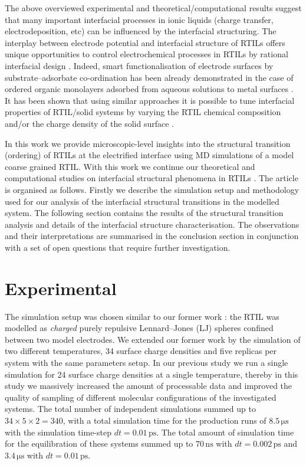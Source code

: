 \documentclass[final,5p,times,twocolumn]{elsarticle}
\begin{document}
The above overviewed experimental and theoretical/computational results suggest that many important interfacial processes in ionic liquids (charge transfer, electrodeposition, etc) can be influenced by the interfacial structuring. The interplay between electrode potential and interfacial structure of RTILs offers unique opportunities to control electrochemical processes in RTILs by rational interfacial design \cite{Endres2010}. Indeed, smart functionalisation of electrode surfaces by substrate--adsorbate co-ordination has been already demonstrated in the case of ordered organic monolayers adsorbed from aqueous solutions to metal surfaces \cite{Dretschkow2003}. It has been shown that using similar approaches it is possible to tune interfacial properties of RTIL/solid systems by varying the RTIL chemical composition and/or the charge density of the solid surface \cite{Opallo2011,Walcarius2013}.

In this work we provide microscopic-level insights into the structural transition (ordering) of RTILs at the electrified interface using MD simulations of a model coarse grained RTIL. With this work we continue our theoretical and computational studies on interfacial structural phenomena in RTILs \cite{Fedorov2008,Fedorov2008a,Fedorov2010,Georgi2010,Fedorov2012,Lynden-Bell2012}. The article is organised as follows. Firstly we describe the simulation setup and methodology used for our analysis of the interfacial structural transitions in the modelled system. The following section contains the results of the structural transition analysis and details of the interfacial structure characterisation. The observations and their interpretations are summarised in the conclusion section in conjunction with a set of open questions that require further investigation.

\section{Experimental}

The simulation setup was chosen similar to our former work \cite{Fedorov2008a}: the RTIL was modelled as \emph{charged} purely repulsive Lennard--Jones (LJ) spheres confined between two model electrodes. We extended our former work \cite{Fedorov2008a} by the simulation of two different temperatures, 34 surface charge densities  and five replicas per system with the same parameters setup. In our previous study we run a single simulation for 24 surface charge densities at a single temperature, thereby in this study we massively increased the amount of processable data and improved the quality of sampling of different molecular configurations of the investigated systems. The total number of independent simulations summed up to $34 \times 5 \times 2=340$, with a total simulation time for the production runs of $8.5\,\mathrm{\mu s}$ with the simulation time-step $dt = 0.01\,\mathrm{ps}$. The total amount of simulation time for the equilibration of these systems summed up to $70\,\mathrm{ns}$ with $dt = 0.002\,\mathrm{ps}$ and $3.4\,\mathrm{\mu s}$ with $dt = 0.01\,\mathrm{ps}$.
\end{document}
